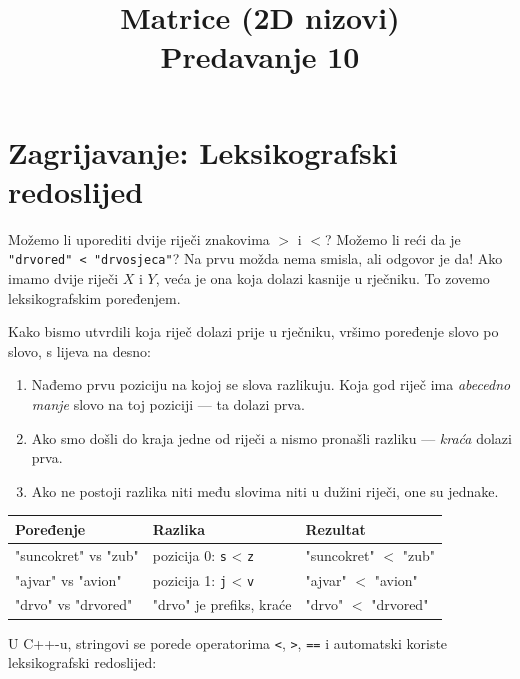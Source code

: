 \documentclass[11pt]{article}
\title{\textbf{Matrice (2D nizovi)}\\[4pt]\large Predavanje 10}
\date{}
\begin{document}
\maketitle
\thispagestyle{fancy}

\section*{Zagrijavanje: Leksikografski redoslijed}

Možemo li uporediti dvije riječi znakovima $>$ i $<$? Možemo li reći da je \texttt{"drvored" < "drvosjeca"}? 
Na prvu možda nema smisla, ali odgovor je da! Ako imamo dvije riječi $X$ i $Y$, veća je ona koja dolazi kasnije u 
rječniku. To zovemo leksikografskim poređenjem.

Kako bismo utvrdili koja riječ dolazi prije u rječniku, vršimo poređenje slovo po slovo, s lijeva na desno:

\begin{enumerate}
    \item Nađemo prvu poziciju na kojoj se slova razlikuju.
          Koja god riječ ima \emph{abecedno manje} slovo na toj poziciji — ta dolazi prva.
    \item Ako smo došli do kraja jedne od riječi a nismo pronašli razliku — \emph{kraća} dolazi prva.
    \item Ako ne postoji razlika niti među slovima niti u dužini riječi, one su jednake.
\end{enumerate}

\begin{center}
\begin{tabular}{@{} >{\ttfamily}l l l @{}}
    \toprule
    \textbf{Poređenje} & \textbf{Razlika} & \textbf{Rezultat} \\
    \midrule
    "suncokret" vs "zub" & pozicija 0: \texttt{s} < \texttt{z} & "suncokret" $<$ "zub" \\
    "ajvar" vs "avion"  & pozicija 1: \texttt{j} < \texttt{v} & "ajvar" $<$ "avion" \\
    "drvo"  vs "drvored" & "drvo" je prefiks, kraće & "drvo" $<$ "drvored" \\
    \bottomrule
\end{tabular}
\end{center}

\smallskip
U C++-u, stringovi se porede operatorima \texttt{<}, \texttt{>}, \texttt{==}
i automatski koriste leksikografski redoslijed:
\end{document}
